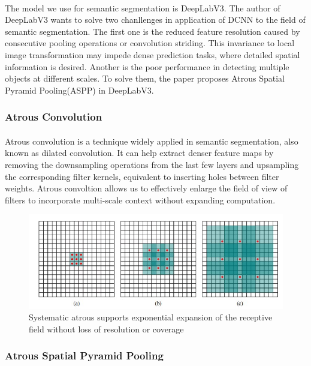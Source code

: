 \paragraph{}
The model we use for semantic segmentation is DeepLabV3\cite{rethinking}. The author of DeepLabV3 wants to solve two chanllenges in application of DCNN to the field of semantic segmentation. The first one is the reduced feature resolution caused by consecutive pooling operations or convolution striding. This invariance to local image transformation may impede dense prediction tasks, where detailed spatial information is desired. Another is the poor performance in detecting multiple objects at different scales. To solve them, the paper proposes Atrous Spatial Pyramid Pooling(ASPP) in DeepLabV3.

\subsubsection{Atrous Convolution}
\paragraph{}
Atrous convolution is a technique widely applied in semantic segmentation, also known as dilated convolution. It can help extract denser feature maps by removing the downsampling operations from the last few layers and upsampling the corresponding filter kernels, equivalent to inserting holes between filter weights. Atrous convoltion allows us to effectively enlarge the field of view of filters to incorporate multi-scale context\cite{dilatedcon} without expanding computation.

\begin{figure}
    \centering
    \includegraphics{Section3/dilated convolution.jpg}
    \caption{Systematic atrous supports exponential expansion of the receptive field without loss of resolution or coverage}
    \label{fig:dilated}
\end{figure}

\subsubsection{Atrous Spatial Pyramid Pooling}
